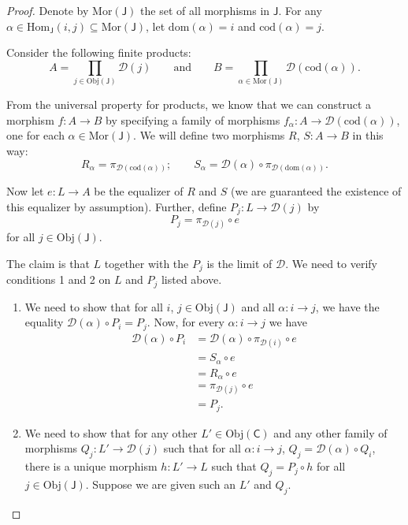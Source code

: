 \documentclass[a4paper]{report}
\newcommand{\Obj}{\mathrm{Obj}}
\newcommand{\Hom}{\mathrm{Hom}}
\newcommand{\Mor}{\mathrm{Mor}}
\newcommand{\dom}{\mathrm{dom}}
\newcommand{\cod}{\mathrm{cod}}
\theoremstyle{definition}
\theoremstyle{plain}
\theoremstyle{remark}
\begin{document}
\begin{proof}
  Denote by $\Mor(\mathsf{J})$ the set of all morphisms in $\mathsf{J}$. For any $\alpha \in \Hom_{\mathsf{J}}(i, j) \subseteq \Mor(\mathsf{J})$, let $\dom(\alpha) = i$ and $\cod(\alpha) = j$.

  Consider the following finite products:
  \begin{equation*}
    A = \prod_{j \in \Obj(\mathsf{J})} \mathcal{D}(j)\qquad\text{and}\qquad B = \prod_{\alpha \in \Mor(\mathsf{J})} \mathcal{D}(\cod(\alpha)).
  \end{equation*}

  From the universal property for products, we know that we can construct a morphism $f\colon A \to B$ by specifying a family of morphisms $f_{\alpha}\colon A \to \mathcal{D}(\cod(\alpha))$, one for each $\alpha \in \Mor(\mathsf{J})$. We will define two morphisms $R$, $S\colon A \to B$ in this way:
  \begin{equation*}
    R_{\alpha} = \pi_{\mathcal{D}(\cod(\alpha))};\qquad S_{\alpha} = \mathcal{D}(\alpha) \circ \pi_{\mathcal{D}(\dom(\alpha))}.
  \end{equation*}

  Now let $e\colon L \to A$ be the equalizer of $R$ and $S$ (we are guaranteed the existence of this equalizer by assumption). Further, define $P_{j}\colon L \to \mathcal{D}(j)$ by
  \begin{equation*}
    P_{j} = \pi_{\mathcal{D}(j)} \circ e
  \end{equation*}
  for all $j \in \Obj(\mathsf{J})$.

  The claim is that $L$ together with the $P_{j}$ is the limit of $\mathcal{D}$. We need to verify conditions 1 and 2 on $L$ and $P_{j}$ listed above.
  \begin{enumerate}
    \item We need to show that for all $i$, $j \in \Obj(\mathsf{J})$ and all $\alpha\colon i \to j$, we have the equality $\mathcal{D}(\alpha) \circ P_{i} = P_{j}$. Now, for every $\alpha\colon i \to j$ we have
      \begin{align*}
        \mathcal{D}(\alpha) \circ P_{i} &= \mathcal{D}(\alpha) \circ \pi_{\mathcal{D}(i)} \circ e \\
        &= S_{\alpha} \circ e \\
        &= R_{\alpha} \circ e \\
        &= \pi_{\mathcal{D}(j)} \circ e \\
        &= P_{j}.
      \end{align*}

    \item We need to show that for any other $L' \in \Obj(\mathsf{C})$ and any other family of morphisms $Q_{j}\colon L' \to \mathcal{D}(j)$ such that for all $\alpha\colon i \to j$, $Q_{j} = \mathcal{D}(\alpha) \circ Q_{i}$, there is a unique morphism $h\colon L' \to L$ such that $Q_{j} = P_{j} \circ h$ for all $j \in \Obj(\mathsf{J})$. Suppose we are given such an $L'$ and $Q_{j}$.


\end{enumerate}
\end{proof}
\end{document}
